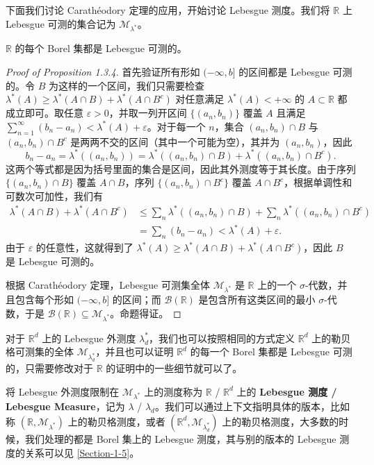 \documentclass[11pt]{article}
\newcommand{\RR}{\mathbb{R}}
\newcommand{\calB}{\mathcal{B}}
\newcommand{\calM}{\mathcal{M}}
\begin{document}
下面我们讨论 Carath\'eodory 定理的应用，开始讨论 Lebesgue 测度。我们将 $\RR$ 上 Lebesgue 可测的集合记为 $\calM_{\lambda^*}$。

\begin{proposition}
    $\RR$ 的每个 Borel 集都是 Lebesgue 可测的。
\end{proposition}

\begin{proof}[Proof of Proposition 1.3.4]
    首先验证所有形如 $(-\infty,b]$ 的区间都是 Lebesgue 可测的。令 $B$ 为这样的一个区间，我们只需要检查 $\lambda^*(A) \ge \lambda^*(A\cap B) + \lambda^*(A\cap B^c)$ 对任意满足 $\lambda^*(A)<+\infty$ 的 $A \subset \RR$ 都成立即可。取任意 $\varepsilon > 0$，并取一列开区间 $\{(a_n,b_n)\}$ 覆盖 $A$ 且满足 $\sum_{n=1}^{\infty}(b_n-a_n)<\lambda^*(A)+\varepsilon$。对于每一个 $n$，集合 $(a_n,b_n)\cap B$ 与 $(a_n,b_n)\cap B^c$ 是两两不交的区间（其中一个可能为空），其并为 $(a_n,b_n)$，因此
    \begin{equation}\label{1-3-Equation-5}
        b_n-a_n = \lambda^*((a_n,b_n)) = \lambda^*((a_n,b_n)\cap B) + \lambda^*((a_n,b_n)\cap B^c).
    \end{equation}
    这两个等式都是因为括号里面的集合是区间，因此其外测度等于其长度。由于序列 $\{(a_n,b_n)\cap B\}$ 覆盖 $A\cap B$，序列 $\{(a_n,b_n)\cap B^c\}$ 覆盖 $A\cap B^c$，根据单调性和可数次可加性，我们有
    \begin{align*}
        \lambda^*(A\cap B) + \lambda^*(A\cap B^c)
         & \le \sum_n \lambda^*((a_n,b_n)\cap B) + \sum_n \lambda^*((a_n,b_n)\cap B^c) \\
         & = \sum_n (b_n-a_n) < \lambda^*(A) + \varepsilon.
    \end{align*}
    由于 $\varepsilon$ 的任意性，这就得到了 $\lambda^*(A)\ge \lambda^*(A\cap B)+\lambda^*(A\cap B^c)$，因此 $B$ 是 Lebesgue 可测的。

    根据 Carath\'eodory 定理，Lebesgue 可测集全体 $\calM_{\lambda^*}$ 是 $\RR$ 上的一个 $\sigma$-代数，并且包含每个形如 $(-\infty,b]$ 的区间；而 $\calB(\RR)$ 是包含所有这类区间的最小 $\sigma$-代数，于是 $\calB(\RR) \subseteq \calM_{\lambda^*}$。命题得证。
\end{proof}

对于 $\RR^d$ 上的 Lebesgue 外测度 $\lambda_d^*$，我们也可以按照相同的方式定义 $\RR^d$ 上的勒贝格可测集的全体 $\calM_{\lambda_d^*}$，并且也可以证明 $\RR^d$ 的每一个 Borel 集都是 Lebesgue 可测的，只需要修改对于 $\RR$ 的证明中的一些细节就可以了。

将 Lebesgue 外测度限制在 $\calM_{\lambda^*}$ 上的测度称为 $\RR$ / $\RR^d$ 上的 {\normalfont\bfseries Lebesgue 测度 / Lebesgue Measure}，记为 $\lambda$ / $\lambda_d$。我们可以通过上下文指明具体的版本，比如称 $(\RR,\calM_{\lambda^*})$ 上的勒贝格测度，或者 $(\RR^d,\calM_{\lambda_d^*})$ 上的勒贝格测度，大多数的时候，我们处理的都是 Borel 集上的 Lebesgue 测度，其与别的版本的 Lebesgue 测度的关系可以见 \ref{Section-1-5}。
\end{document}
